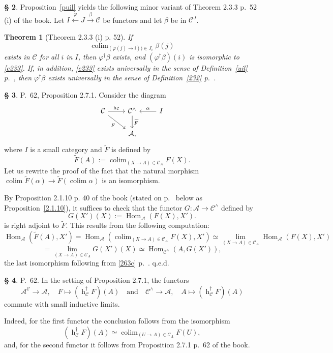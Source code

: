 \documentclass[12pt]{article}
\newtheorem{thm}{Theorem}
\theoremstyle{remark}
\theoremstyle{definition}
\newtheorem{s}[thm]{\S}
\newcommand{\oo}{\operatorname}
\newcommand{\A}{\mathcal A}
\newcommand{\C}{\mathcal C}
\newcommand{\pp}{\varphi}
\newcommand{\xr}{\xrightarrow}
\DeclareMathOperator*{\colim}{colim}
\DeclareMathOperator{\hy}{h}
\DeclareMathOperator{\Hom}{Hom}
\begin{document}
\begin{s} 
Proposition~\ref{puil} yields the following minor variant of Theorem 2.3.3 p.~52 (i) of the book. Let $I\xleftarrow\pp J\xr\beta\C$ be functors and let $\beta$ be in $\C^J$. 

\begin{thm}[Theorem 2.3.3 (i) p. 52]\label{233}
If 
%
\begin{equation}\label{e233}
\colim_{(\pp(j)\to i))\in J_i}\beta(j)
\end{equation}
%
exists in $\C$ for all $i$ in $I$, then $\pp^\dagger\beta$ exists, and $(\pp^\dagger\beta)(i)$ is isomorphic to \eqref{e233}. If, in addition, \eqref{e233} exists universally in the sense of Definition~\ref{uil} p.~\pageref{uil}, then $\pp^\dagger\beta$ exists universally in the sense of Definition~\ref{232} p.~\pageref{232}. 
\end{thm}
\end{s}

%

\begin{s}\label{c271b}
P.~62, Proposition 2.7.1. Consider the diagram 
$$
\begin{tikzcd}
\C\ar{r}{\hy_\C}\ar{dr}[swap]{F}&\C^\wedge\ar{d}{\widetilde F}&I\ar{l}[swap]{\alpha}\\
&\A,
\end{tikzcd}
$$
where $I$ is a small category and $\widetilde F$ is defined by 
$$
\widetilde F(A):=\colim_{(X\to A)\in\C_A}F(X). 
$$
Let us rewrite the proof of the fact that the natural morphism $\colim\widetilde F(\alpha)\to\widetilde F\left(\colim\alpha\right)$ is an isomorphism. 

By Proposition 2.1.10 p. 40 of the book (stated on p.~\pageref{2.1.10} below as Proposition~\ref{2.1.10}), it suffices to check that the functor $G:\A\to\C^\wedge$ defined by 
$$
G(X')(X):=\Hom_{\A}(F(X),X').
$$ 
is right adjoint to $\widetilde F$. This results from the following computation: 
$$
\Hom_{\A}\left(\widetilde F(A),X'\right)=
\Hom_{\A}\left(\colim_{(X\to A)\in\C_A}F(X),X'\right)\simeq 
\lim_{(X\to A)\in\C_A}\Hom_{\A}(F(X),X')
$$
$$
=\lim_{(X\to A)\in\C_A}G(X')(X)\simeq\Hom_{\C^\wedge}(A,G(X')), 
$$ 
the last isomorphism following from \eqref{263c} p.~\pageref{263c}. q.e.d.
\end{s}

%

\begin{s}\label{bil}
P.~62. In the setting of Proposition 2.7.1, the functors
$$
\A^\C\to\A,\quad F\mapsto(\oo h_\C^\dagger F)(A)\quad\text{and}\quad
\C^\wedge\to\A,\quad A\mapsto(\oo h_\C^\dagger F)(A)
$$ 
commute with small inductive limits. 

Indeed, for the first functor the conclusion follows from the isomorphism 
$$
(\oo h_\C^\dagger F)(A)\simeq\colim_{(U\to A)\in\C_A}F(U),
$$ 
and, for the second functor it follows from Proposition 2.7.1 p.~62 of the book.
\end{s} 
\end{document}
